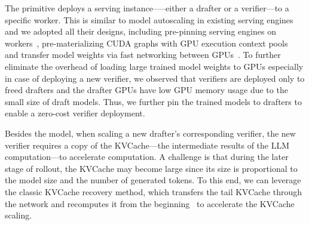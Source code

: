 The primitive deploys a serving instance—--either a drafter or a verifier—to a specific worker.
This is similar to model autoscaling in existing serving engines~\cite{DBLP:conf/osdi/FuXHBUPM24,DBLP:conf/sosp/Xiang0QYZYZL0025,DBLP:conf/sosp/WeiHSH0H0025,DBLP:conf/asplos/ZengXGCL25,DBLP:conf/osdi/ZhangWLWS0025} 
and we adopted all their designs, 
including pre-pinning serving engines on workers~\cite{DBLP:conf/sosp/Xiang0QYZYZL0025},
pre-materializing CUDA graphs with GPU execution context pools~\cite{DBLP:conf/asplos/ZengXGCL25,DBLP:conf/sosp/WeiHSH0H0025}
and transfer model weights via fast networking between GPUs~\cite{DBLP:conf/osdi/ZhangWLWS0025}. 
To further eliminate the overhead of loading large trained model weights to GPUs
especially in case of deploying a new verifier, 
we observed that verifiers are deployed only to freed drafters and the 
drafter GPUs have low GPU memory usage due to the small size of draft models. 
Thus, we further pin the trained models to drafters to enable a zero-cost verifier deployment. 


Besides the model, when scaling a new drafter's corresponding verifier,
the new verifier requires a copy of the KVCache---the intermediate results
of the LLM computation---to accelerate computation.
A challenge is that during the later stage of rollout,
the KVCache may become large since its size is proportional to the model size and the number of
generated tokens.
To this end, we can leverage the classic KVCache recovery method,
which transfers the tail KVCache through the network
and recomputes it from the beginning~\cite{DBLP:journals/corr/abs-2410-03065}
to accelerate the KVCache scaling.

